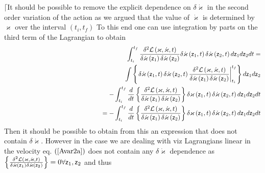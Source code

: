 $\lceil $It should be possible to remove the explicit dependence on $\delta 
\dot{\varkappa}$ in the second order variation of the action as we argued
that the value of $\dot{\varkappa}$ is determined by $\varkappa $ over the
interval $\left( t_{i},t_{f}\right) $ To this end one can use integration by
parts on the third term of the Lagrangian to obtain 
\begin{eqnarray}
&&\int_{t_{i}}^{t_{f}}\frac{\delta ^{2}{\cal L}\left( {\cal \varkappa },%
{\cal \dot{\varkappa}},t\right) }{\delta \dot{\varkappa}\left( {\sf z}%
_{1}\right) \delta \dot{\varkappa}\left( {\sf z}_{2}\right) }\delta \dot{%
\varkappa}\left( {\sf z}_{1},t\right) \delta \dot{\varkappa}\left( {\sf z}%
_{2},t\right) d{\sf z}_{1}d{\sf z}_{2}dt=  \nonumber \\
&&\int \left\{ \left. \delta \dot{\varkappa}\left( {\sf z}_{1},t\right)
\delta \dot{\varkappa}\left( {\sf z}_{2},t\right) \frac{\delta ^{2}{\cal L}%
\left( {\cal \varkappa },{\cal \dot{\varkappa}},t\right) }{\delta \dot{%
\varkappa}\left( {\sf z}_{1}\right) \delta \dot{\varkappa}\left( {\sf z}%
_{2}\right) }\right| _{t_{i}}^{t_{f}}\right\} d{\sf z}_{1}d{\sf z}_{2} 
\nonumber \\
&&\qquad \qquad \qquad \qquad \qquad -\int_{t_{i}}^{t_{f}}\frac{d}{dt}%
\left\{ \frac{\delta ^{2}{\cal L}\left( \varkappa ,\dot{\varkappa},t\right) 
}{\delta \dot{\varkappa}\left( {\sf z}_{1}\right) \delta \dot{\varkappa}%
\left( {\sf z}_{2}\right) }\right\} \delta \varkappa \left( {\sf z}%
_{1},t\right) \delta \dot{\varkappa}\left( {\sf z}_{2},t\right) d{\sf z}_{1}d%
{\sf z}_{2}dt  \nonumber \\
&&\left. {}\right. \qquad \qquad \qquad \qquad \qquad \qquad \qquad
=-\int_{t_{i}}^{t_{f}}\frac{d}{dt}\left\{ \frac{\delta ^{2}{\cal L}\left(
\varkappa ,\dot{\varkappa},t\right) }{\delta \dot{\varkappa}\left( {\sf z}%
_{1}\right) \delta \dot{\varkappa}\left( {\sf z}_{2}\right) }\right\} \delta
\varkappa \left( {\sf z}_{1},t\right) \delta \dot{\varkappa}\left( {\sf z}%
_{2},t\right) d{\sf z}_{1}d{\sf z}_{2}dt
\end{eqnarray}%
Then it should be possible to obtain from this an expression that does not
contain $\delta \dot{\varkappa}$. However in the case we are dealing with
viz Lagrangians linear in the velocity eq. $\left( \ref{Avar2a}\right) $
does not contain any $\delta \dot{\varkappa}$ dependence as $\left\{ \frac{%
\delta ^{2}{\cal L}\left( \varkappa ,\dot{\varkappa},t\right) }{\delta \dot{%
\varkappa}\left( {\sf z}_{1}\right) \delta \dot{\varkappa}\left( {\sf z}%
_{2}\right) }\right\} =0\forall {\sf z}_{1},{\sf z}_{2}$ and thus 
